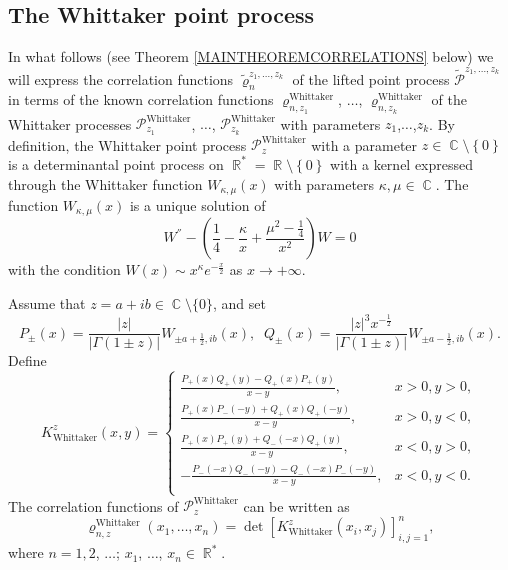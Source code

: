 \documentclass[12pt]{amsart}
\theoremstyle{definition}
\numberwithin{equation}{section}
\DeclareMathOperator{\R}{\mathbb{R}}
\DeclareMathOperator{\C}{\mathbb{C}}
\DeclareMathOperator{\Whittaker}{Whittaker}
\begin{document}
\subsection{The Whittaker point  process}\label{SectionWhitt}
In what follows (see Theorem \ref{MAINTHEOREMCORRELATIONS} below) we will
express the correlation functions $\widetilde{\varrho}_n^{z_1,\ldots,z_k}$ of the lifted point process $\widetilde{\mathcal{P}}^{z_1,\ldots,z_k}$ in terms of the known correlation functions $\varrho_{n,z_1}^{\Whittaker}$, $\ldots$,
$\varrho_{n,z_k}^{\Whittaker}$ of the Whittaker processes $\mathcal{P}_{z_1}^{\Whittaker}$, $\ldots$, $\mathcal{P}_{z_k}^{\Whittaker}$
with parameters
$z_1$,$\ldots$,$z_k$.  By definition, the Whittaker point process $\mathcal{P}_{z}^{\Whittaker}$  with a parameter $z\in\C\setminus\left\{0\right\}$ is a determinantal point process on $\R^{\ast}=\R\setminus\left\{0\right\}$ with a kernel expressed through the Whittaker function $W_{\kappa,\mu}(x)$  with parameters $\kappa,\mu\in\C$.
The function $W_{\kappa,\mu}(x)$
is a unique solution of
$$
W^{''}-\left(\frac{1}{4}-\frac{\kappa}{x}+\frac{\mu^2-\frac{1}{4}}{x^2}\right)W=0
$$
with the condition $W(x)\sim x^{\kappa}e^{-\frac{x}{2}}$ as $x\rightarrow+\infty$.







Assume that $z=a+ib\in\C\setminus\{0\}$, and set
$$
P_{\pm}(x)=\frac{|z|}{|\Gamma(1\pm z)|}W_{\pm a+\frac{1}{2}, ib}(x),\;\;
Q_{\pm}(x)=\frac{|z|^{3}x^{-\frac{1}{2}}}{|\Gamma(1\pm z)|}W_{\pm a-\frac{1}{2}, ib}(x).
$$
Define
\begin{equation}
K^z_{\Whittaker}(x,y)=
\left\{
\begin{array}{ll}
\frac{P_+(x)Q_+(y)-Q_+(x)P_+(y)}{x-y}, & x>0, y>0,\\
\frac{P_+(x)P_-(-y)+Q_+(x)Q_+(-y)}{x-y}, & x>0, y<0,\\
\frac{P_+(x)P_+(y)+Q_-(-x)Q_+(y)}{x-y}, & x<0, y>0,\\
-\frac{P_-(-x)Q_-(-y)-Q_-(-x)P_-(-y)}{x-y}, & x<0, y<0.\\
\end{array}
\right.
\end{equation}
The correlation functions of $\mathcal{P}_{z}^{\Whittaker}$ can be written as
\begin{equation}
\varrho_{n,z}^{\Whittaker}\left(x_1,\ldots,x_n\right)=
\det\left[K^z_{\Whittaker}(x_i,x_j)\right]_{i,j=1}^n,
\end{equation}
where $n=1,2$, $\ldots$; $x_1$, $\ldots$, $x_n\in\R^{\ast}$.
\end{document}

